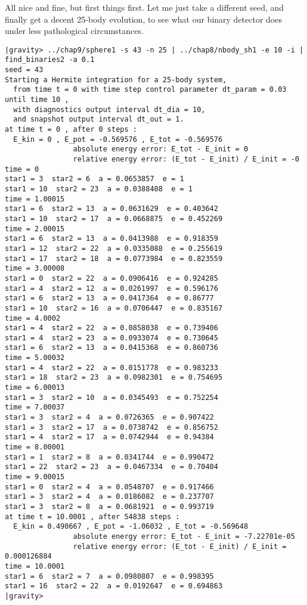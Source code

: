 \bob
All nice and fine, but first things first.  Let me just take a
different seed, and finally get a decent 25-body evolution, to see
what our binary detector does under less pathological circumstances.

\cba

\begin{small}
\begin{verbatim}
|gravity> ../chap9/sphere1 -s 43 -n 25 | ../chap8/nbody_sh1 -e 10 -i | find_binaries2 -a 0.1
seed = 43
Starting a Hermite integration for a 25-body system,
  from time t = 0 with time step control parameter dt_param = 0.03  until time 10 ,
  with diagnostics output interval dt_dia = 10,
  and snapshot output interval dt_out = 1.
at time t = 0 , after 0 steps :
  E_kin = 0 , E_pot = -0.569576 , E_tot = -0.569576
                absolute energy error: E_tot - E_init = 0
                relative energy error: (E_tot - E_init) / E_init = -0
time = 0
star1 = 3  star2 = 6  a = 0.0653857  e = 1
star1 = 10  star2 = 23  a = 0.0388408  e = 1
time = 1.00015
star1 = 6  star2 = 13  a = 0.0631629  e = 0.403642
star1 = 10  star2 = 17  a = 0.0668875  e = 0.452269
time = 2.00015
star1 = 6  star2 = 13  a = 0.0413988  e = 0.918359
star1 = 12  star2 = 22  a = 0.0335088  e = 0.255619
star1 = 17  star2 = 18  a = 0.0773984  e = 0.823559
time = 3.00008
star1 = 0  star2 = 22  a = 0.0906416  e = 0.924285
star1 = 4  star2 = 12  a = 0.0261997  e = 0.596176
star1 = 6  star2 = 13  a = 0.0417364  e = 0.86777
star1 = 10  star2 = 16  a = 0.0706447  e = 0.835167
time = 4.0002
star1 = 4  star2 = 22  a = 0.0858038  e = 0.739406
star1 = 4  star2 = 23  a = 0.0933074  e = 0.730645
star1 = 6  star2 = 13  a = 0.0415368  e = 0.860736
time = 5.00032
star1 = 4  star2 = 22  a = 0.0151778  e = 0.983233
star1 = 18  star2 = 23  a = 0.0982301  e = 0.754695
time = 6.00013
star1 = 3  star2 = 10  a = 0.0345493  e = 0.752254
time = 7.00037
star1 = 3  star2 = 4  a = 0.0726365  e = 0.907422
star1 = 3  star2 = 17  a = 0.0738742  e = 0.856752
star1 = 4  star2 = 17  a = 0.0742944  e = 0.94384
time = 8.00001
star1 = 1  star2 = 8  a = 0.0341744  e = 0.990472
star1 = 22  star2 = 23  a = 0.0467334  e = 0.70404
time = 9.00015
star1 = 0  star2 = 4  a = 0.0548707  e = 0.917466
star1 = 3  star2 = 4  a = 0.0186082  e = 0.237707
star1 = 3  star2 = 8  a = 0.0681921  e = 0.993719
at time t = 10.0001 , after 54838 steps :
  E_kin = 0.490667 , E_pot = -1.06032 , E_tot = -0.569648
                absolute energy error: E_tot - E_init = -7.22701e-05
                relative energy error: (E_tot - E_init) / E_init = 0.000126884
time = 10.0001
star1 = 6  star2 = 7  a = 0.0980807  e = 0.998395
star1 = 16  star2 = 22  a = 0.0192647  e = 0.694863
|gravity> 
\end{verbatim}
\end{small}

